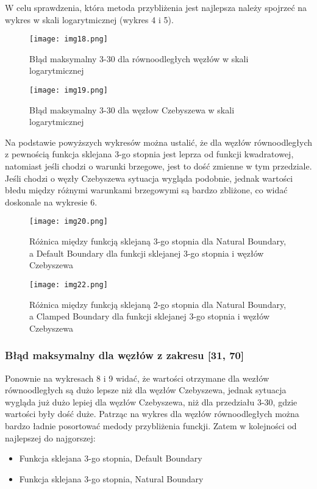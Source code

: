 \documentclass{article}
\begin{document}
\noindent
W celu sprawdzenia, która metoda przybliżenia jest najlepsza należy spojrzeć na wykres w skali logarytmicznej (wykres 4 i 5).

\begin{figure}[H]
  \begin{minipage}[b]{0.49\textwidth}
    \texttt{[image: img18.png]}
    \caption{Błąd maksymalny 3-30 dla równoodległych węzłów w skali logarytmicznej}
  \end{minipage}
  \hfill
  \begin{minipage}[b]{0.49\textwidth}
    \texttt{[image: img19.png]}
    \caption{Błąd maksymalny 3-30 dla węzłow Czebyszewa w skali logarytmicznej}
  \end{minipage}
\end{figure}

\noindent
Na podstawie powyższych wykresów można ustalić, że dla węzłów równoodległych z pewnością funkcja sklejana 3-go stopnia jest leprza od funkcji kwadratowej, natomiast jeśli chodzi o warunki brzegowe, jest to dość zmienne w tym przedziale. 
\bigbreak
\noindent
Jeśli chodzi o węzły Czebyszewa sytuacja wygląda podobnie, jednak wartości błedu między różnymi warunkami brzegowymi są bardzo zbliżone, co widać doskonale na wykresie 6.

\begin{figure}[H]
  \begin{minipage}[b]{0.49\textwidth}
    \texttt{[image: img20.png]}
    \caption{Różnica między funkcją sklejaną 3-go stopnia dla Natural Boundary, a Default Boundary dla funkcji sklejanej 3-go stopnia i węzłów Czebyszewa}
  \end{minipage}
  \hfill
  \begin{minipage}[b]{0.49\textwidth}
    \texttt{[image: img22.png]}
    \caption{Różnica między funkcją sklejaną 2-go stopnia dla Natural Boundary, a Clamped Boundary dla funkcji sklejanej 3-go stopnia i węzłów Czebyszewa}
  \end{minipage}
\end{figure}


\subsubsection{Błąd maksymalny dla węzłów z zakresu [31, 70]}

Ponownie na wykresach 8 i 9 widać, że wartości otrzymane dla wezłów równoodległych są dużo lepsze niż dla węzłów Czebyszewa, jednak sytuacja wygląda już dużo lepiej dla węzłów Czebyszewa, niż dla przedziału 3-30, gdzie wartości były dość duże.
\bigbreak
\noindent
Patrząc na wykres dla węzłów równoodległych można bardzo ładnie posortować medody przybliżenia funckji. Zatem w kolejności od najlepszej do najgorszej:
\begin{itemize}
\item Funkcja sklejana 3-go stopnia, Default Boundary
\item Funkcja sklejana 3-go stopnia, Natural Boundary
\end{itemize}
\end{document}
